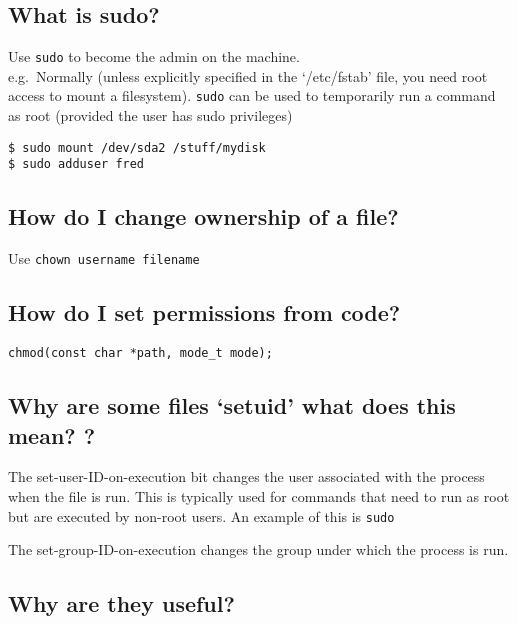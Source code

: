 \subsection{What is sudo?}\label{what-is-sudo}

Use \texttt{sudo} to become the admin on the machine.\\e.g.~Normally
(unless explicitly specified in the `/etc/fstab' file, you need root
access to mount a filesystem). \texttt{sudo} can be used to temporarily
run a command as root (provided the user has sudo privileges)

\begin{verbatim}
$ sudo mount /dev/sda2 /stuff/mydisk
$ sudo adduser fred
\end{verbatim}

\subsection{How do I change ownership of a
file?}\label{how-do-i-change-ownership-of-a-file}

Use \texttt{chown\ username\ filename}

\subsection{How do I set permissions from
code?}\label{how-do-i-set-permissions-from-code}

\texttt{chmod(const\ char\ *path,\ mode\_t\ mode);}

\subsection{\texorpdfstring{Why are some files `setuid' what does this
mean?
?}{Why are some files setuid what does this mean? ?}}\label{why-are-some-files-setuid-what-does-this-mean}

The set-user-ID-on-execution bit changes the user associated with the
process when the file is run. This is typically used for commands that
need to run as root but are executed by non-root users. An example of
this is \texttt{sudo}

The set-group-ID-on-execution changes the group under which the process
is run.

\subsection{Why are they useful?}\label{why-are-they-useful}

